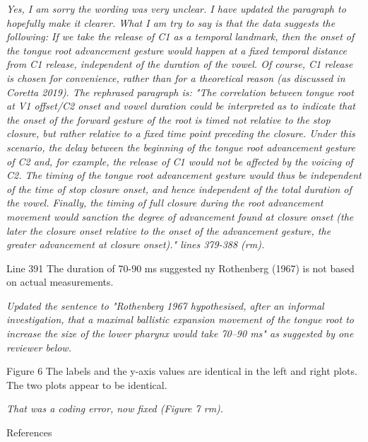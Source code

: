 \documentclass[]{article}
\begin{document}
\begin{adjustwidth}{1cm}{} \textit{
Yes, I am sorry the wording was very unclear. I have updated the paragraph to hopefully make it clearer. What I am try to say is that the data suggests the following: If we take the release of C1 as a temporal landmark, then the onset of the tongue root advancement gesture would happen at a fixed temporal distance from C1 release, independent of the duration of the vowel. Of course, C1 release is chosen for convenience, rather than for a theoretical reason (as discussed in Coretta 2019). The rephrased paragraph is: "The correlation between tongue root at V1 offset/C2 onset and vowel duration could be interpreted as to indicate that the onset of the forward gesture of the root is timed not relative to the stop closure, but rather relative to a fixed time point preceding the closure.
Under this scenario, the delay between the beginning of the tongue root advancement gesture of C2 and, for example, the release of C1 would not be affected by the voicing of C2.
The timing of the tongue root advancement gesture would thus be independent of the time of stop closure onset, and hence independent of the total duration of the vowel.
Finally, the timing of full closure during the root advancement movement would sanction the degree of advancement found at closure onset (the later the closure onset relative to the onset of the advancement gesture, the greater advancement at closure onset)." lines 379-388 (rm).
} \end{adjustwidth}

Line 391 The duration of 70-90 ms suggested ny Rothenberg (1967) is not
based on actual measurements.

\begin{adjustwidth}{1cm}{} \textit{
Updated the sentence to "Rothenberg 1967 hypothesised, after an informal investigation, that a maximal ballistic expansion movement of the tongue root to increase the size of the lower pharynx would take 70--90 ms" as suggested by one reviewer below.
} \end{adjustwidth}

Figure 6 The labels and the y-axis values are identical in the left and
right plots. The two plots appear to be identical.

\begin{adjustwidth}{1cm}{} \textit{
That was a coding error, now fixed (Figure 7 rm).
} \end{adjustwidth}

References
\end{document}

